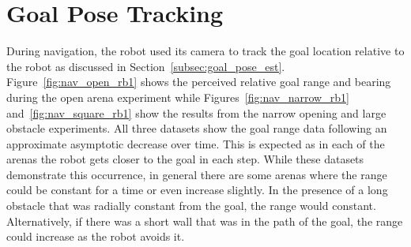 \section{Goal Pose Tracking} \label{sec:nav_goal_pose_tracking}
During navigation, the robot used its camera to track the goal location relative to
the robot as discussed in Section~\ref{subsec:goal_pose_est}. 
Figure~\ref{fig:nav_open_rb1} shows the perceived relative goal range and bearing during the open arena
experiment while Figures~\ref{fig:nav_narrow_rb1} and~\ref{fig:nav_square_rb1} show the results from the
narrow opening and large obstacle experiments.
All three datasets show the goal range data following an approximate asymptotic decrease over time.
This is expected as in each of the arenas the robot gets closer to the goal in each step.
While these datasets demonstrate this occurrence, in general there are some arenas where the range
could be constant for a time or even increase slightly. In the presence of a long obstacle that was
radially constant from the goal, the range would constant. Alternatively, if there was a short wall
that was in the path of the goal, the range could increase as the robot avoids it.


